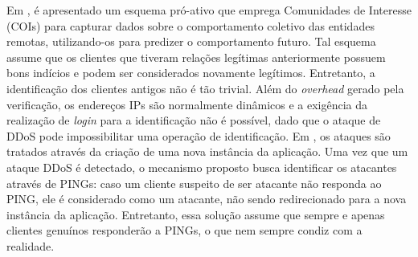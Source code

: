 Em \cite{Verkaik:2006:PCD:1162666.1162673}, é apresentado um esquema pró-ativo que emprega Comunidades de Interesse (COIs) para capturar dados sobre o comportamento coletivo das entidades remotas, utilizando-os para predizer o comportamento futuro. Tal esquema assume que os clientes que tiveram relações legítimas anteriormente possuem bons indícios e podem ser considerados novamente legítimos. %
%
Entretanto, a identificação dos clientes antigos não é tão trivial. Além do \emph{overhead} gerado pela verificação, os endereços IPs são normalmente dinâmicos e a exigência da realização de \emph{login} para a identificação não é possível, dado que o ataque de DDoS pode impossibilitar uma operação de identificação.
%
%
Em \cite{Bakshi:10}, os ataques são tratados através da criação de uma nova instância da aplicação. Uma vez que um ataque DDoS é detectado, o mecanismo proposto busca identificar os atacantes através de PINGs: caso um cliente suspeito de ser atacante não responda ao PING, ele é considerado como um atacante, não sendo redirecionado para a nova instância da aplicação. 
Entretanto, essa solução assume que sempre e apenas clientes genuínos responderão a PINGs, o que nem sempre condiz com a realidade.





